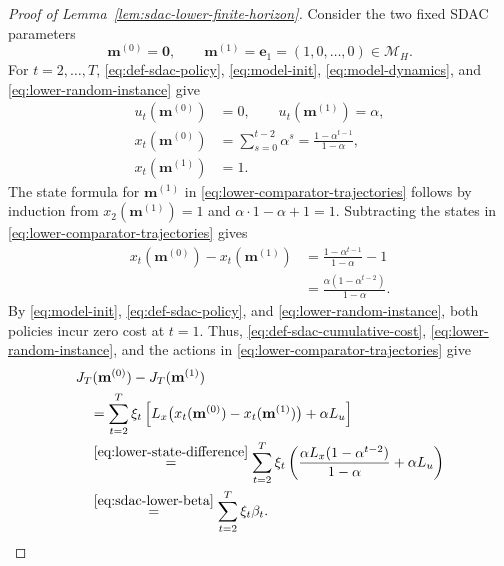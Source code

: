 \documentclass[journal]{IEEEtran}
\theoremstyle{remark}
\begin{document}
\begin{proof}[Proof of Lemma~\ref{lem:sdac-lower-finite-horizon}]
Consider the two fixed SDAC parameters
\begin{equation}
\label{eq:lower-comparator-parameters}
\mathbf{m}^{(0)}=\mathbf{0},\qquad
\mathbf{m}^{(1)}=\mathbf{e}_1=(1,0,\ldots,0)\in\mathcal{M}_H.
\end{equation}
For $t=2,\ldots,T$, \eqref{eq:def-sdac-policy}, \eqref{eq:model-init},
\eqref{eq:model-dynamics}, and \eqref{eq:lower-random-instance} give
\begin{equation}
\label{eq:lower-comparator-trajectories}
\begin{aligned}
u_t(\mathbf{m}^{(0)})&=0,\qquad
u_t(\mathbf{m}^{(1)})=\alpha,\\
x_t(\mathbf{m}^{(0)})
&=\sum_{s=0}^{t-2}\alpha^s
=\frac{1-\alpha^{t-1}}{1-\alpha},\\
x_t(\mathbf{m}^{(1)})&=1.
\end{aligned}
\end{equation}
The state formula for $\mathbf{m}^{(1)}$ in
\eqref{eq:lower-comparator-trajectories} follows by induction from
$x_2(\mathbf{m}^{(1)})=1$ and $\alpha\cdot1-\alpha+1=1$.
Subtracting the states in \eqref{eq:lower-comparator-trajectories} gives
\begin{equation}
\label{eq:lower-state-difference}
\begin{aligned}
x_t(\mathbf{m}^{(0)})-x_t(\mathbf{m}^{(1)})
&=\frac{1-\alpha^{t-1}}{1-\alpha}-1\\
&=\frac{\alpha(1-\alpha^{t-2})}{1-\alpha}.
\end{aligned}
\end{equation}
By \eqref{eq:model-init}, \eqref{eq:def-sdac-policy}, and
\eqref{eq:lower-random-instance}, both policies incur zero cost at $t=1$.
Thus, \eqref{eq:def-sdac-cumulative-cost}, \eqref{eq:lower-random-instance},
and the actions in \eqref{eq:lower-comparator-trajectories} give
\begin{equation}
\label{eq:lower-cost-difference}
\begin{aligned}
&J_T(\mathbf{m}^{(0)})-J_T(\mathbf{m}^{(1)})\\
&\quad=\sum_{t=2}^T\xi_t
\left[L_x\bigl(x_t(\mathbf{m}^{(0)})-x_t(\mathbf{m}^{(1)})\bigr)
+\alpha L_u\right]\\
&\quad\overset{\eqref{eq:lower-state-difference}}{=}
\sum_{t=2}^T\xi_t
\left(\frac{\alpha L_x(1-\alpha^{t-2})}{1-\alpha}+\alpha L_u\right)\\
&\quad\overset{\eqref{eq:sdac-lower-beta}}{=}
\sum_{t=2}^T\xi_t\beta_t.
\end{aligned}
\end{equation}


\end{proof}
\end{document}
